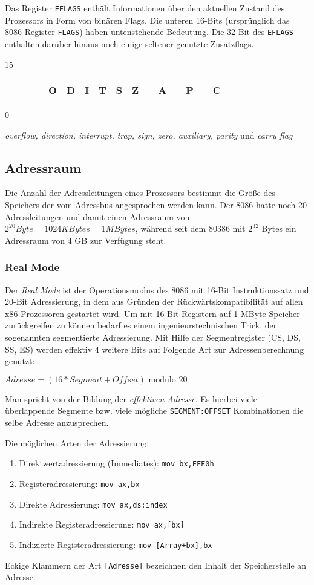 Das Register {\tt EFLAGS} enthält Informationen über den aktuellen Zustand des Prozessors in Form von binären Flags. Die unteren 16-Bits (ursprünglich das 8086-Register {\tt FLAGS}) haben untenstehende Bedeutung. Die 32-Bit des {\tt EFLAGS} enthalten darüber hinaus noch einige seltener genutzte Zusatzflags.

{\small 15}
\begin{tabular}{|c|c|c|c|c|c|c|c|c|c|c|c|c|c|c|c|c|}
\hline & & & & O & D & I & T & S & Z & & A & & P & & C \\
\hline
\end{tabular}
{\small 0}

\emph{overflow, direction, interrupt, trap, sign, zero, auxiliary, parity}
und \emph{carry flag} 

\subsection{Adressraum}

Die Anzahl der Adressleitungen eines Prozessors bestimmt die Größe des Speichers der vom Adressbus angesprochen werden kann. Der 8086 hatte noch 20-Adressleitungen und damit einen Adressraum von $2^20 Byte = 1024 KBytes = 1 MBytes$, während seit dem 80386 mit $2^32$ Bytes ein Adressraum von 4 GB zur Verfügung steht.

\subsubsection{Real Mode}

Der \emph{Real Mode} ist der Operationsmodus des 8086 mit 16-Bit Instruktionssatz und 20-Bit Adressierung, in dem aus Gründen der Rückwärtskompatibilität auf allen x86-Prozessoren gestartet wird. Um mit 16-Bit Registern auf 1 MByte Speicher zurückgreifen zu können bedarf es einem ingenieurstechnischen Trick, der sogenannten segmentierte Adressierung. Mit Hilfe der Segmentregister (CS, DS, SS, ES) werden effektiv 4 weitere Bits auf Folgende Art zur Adressenberechnung genutzt:

$Adresse = (16 * Segment + Offset) \text{ modulo } 20$

Man spricht von der Bildung der \emph{effektiven Adresse}. Es hierbei viele überlappende Segmente bzw. viele mögliche \texttt{SEGMENT:OFFSET} Kombinationen die selbe Adresse anzusprechen.

Die möglichen Arten der Adressierung:

\begin{enumerate}
\item Direktwertadressierung (Immediates): {\tt mov bx,FFF0h}
\item Registeradressierung: {\tt mov 	ax,bx}
\item Direkte Adressierung: {\tt mov 	ax,ds:index}
\item Indirekte Registeradressierung: {\tt mov ax,[bx]}
\item Indizierte Registeradressierung: {\tt mov [Array+bx],bx}
\end{enumerate}
Eckige Klammern der Art {\tt [Adresse]} bezeichnen den Inhalt der Speicherstelle an Adresse.

